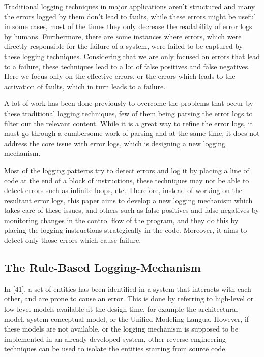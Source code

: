 Traditional logging techniques in major applications aren’t structured and many the errors logged by them don’t lead to faults, while these errors might be useful in some cases, most of the times they only decrease the readability of error logs by humans. Furthermore, there are some instances where errors, which were directly responsible for the failure of a system, were failed to be captured by these logging techniques. Considering that we are only focused on errors that lead to a failure, these techniques lead to a lot of false positives and false negatives. Here we focus only on the effective errors, or the errors which leads to the activation of faults, which in turn leads to a failure. 

A lot of work has been done previously to overcome the problems that occur by these traditional logging techniques, few of them being parsing the error logs to filter out the relevant content. While it is a great way to refine the error logs, it must go through a cumbersome work of parsing and at the same time, it does not address the core issue with error logs, which is designing a new logging mechanism. 

Most of the logging patterns try to detect errors and log it by placing a line of code at the end of a block of instructions, these techniques may not be able to detect errors such as infinite loops, etc. Therefore, instead of working on the resultant error logs, this paper aims to develop a new logging mechanism which takes care of these issues, and others such as false positives and false negatives by monitoring changes in the control flow of the program, and they do this by placing the logging instructions strategically in the code. Moreover, it aims to detect only those errors which cause failure. 

\subsection{The Rule-Based Logging-Mechanism}

In [41], a set of entities has been identified in a system that interacts with each other, and are prone to cause an error. This is done by referring to high-level or low-level models available at the design time, for example the architectural model, system conceptual model, or the Unified Modeling Langua. However, if these models are not available, or the logging mechanism is supposed to be implemented in an already developed system, other reverse engineering techniques can be used to isolate the entities starting from source code.

